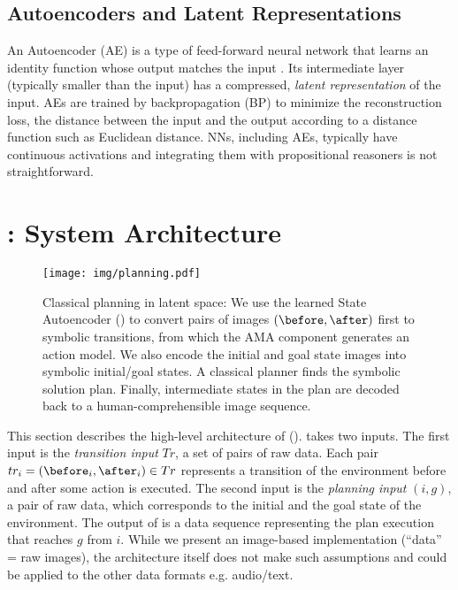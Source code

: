 \documentclass[11pt]{article}
\begin{document}




\subsection{Autoencoders and Latent Representations}
An Autoencoder (AE) is a type of feed-forward neural network that learns an identity function whose output matches the input \cite{hinton2006reducing}.
Its intermediate layer (typically smaller than the input) has a compressed, \emph{latent representation} of the input.
AEs are trained by backpropagation (BP) to minimize the reconstruction loss, the distance between the input and the output according to a distance function such as Euclidean distance.
NNs, including AEs, typically have continuous activations and integrating them with propositional reasoners is not straightforward.



\section{\latentplanner:  System Architecture}
\label{sec:overview}

\begin{figure}[tbp]
 \centering
 \texttt{[image: img/planning.pdf]}
 \caption{Classical planning in latent space:
We use the learned State Autoencoder () to convert pairs of images $(\before,\after)$ first to symbolic transitions, from which the AMA component generates an action model.
We also encode the initial and goal state images into symbolic initial/goal states.
A classical planner finds the symbolic solution plan.
Finally, intermediate states in the plan are decoded back to a human-comprehensible image sequence.}
\label{fig:overview}
\end{figure}

This section describes the high-level architecture of \latentplanner ().
\latentplanner takes two inputs.
The first input is the \emph{transition input} $Tr$, a set of pairs of raw data.
Each pair $tr_i=(\before_i, \after_i) \in Tr$ represents a transition of the environment before and after some action is executed.
The second input is the \emph{planning input} $(i, g)$, a pair of raw data, which corresponds to the initial and the goal state of the environment.
The output of \latentplanner is a data sequence representing the plan execution that reaches $g$ from $i$.
While we present an image-based implementation (``data'' = raw images),
the architecture itself does not make such assumptions
and could be applied to the other data formats e.g. audio/text.
\end{document}
